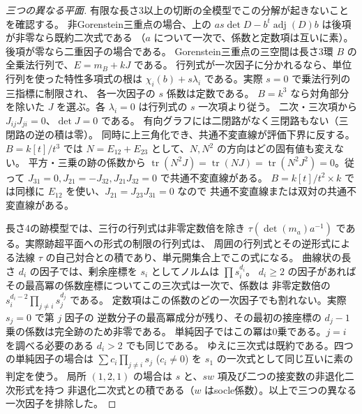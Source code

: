 \begin{proof}[三つの異なる平面]
有限な長さ3以上の切断の全模型でこの分解が起きないことを確認する。
非Gorenstein三重点の場合、上の $a s\det D-b^t\operatorname{adj}(D)b$ は後項が非零なら既約二次式である
（$a$ について一次で、係数と定数項は互いに素）。後項が零なら二重因子の場合である。
Gorenstein三重点の三空間は長さ3環 $B$ の全乗法行列で、$E=m_B+kJ$ である。
行列式が一次因子に分かれるなら、単位行列を使った特性多項式の根は
$\chi_i(b)+s\lambda_i$ である。実際 $s=0$ で乗法行列の三指標に制限され、
各一次因子の $s$ 係数は定数である。
$B=k^3$ なら対角部分を除いた $J$ を選ぶ。各 $\lambda_i=0$ は行列式の $s$ 一次項より従う。
二次・三次項から $J_{ij}J_{ji}=0$、$\det J=0$ である。
有向グラフには二閉路がなく三閉路もない（三閉路の逆の積は零）。
同時に上三角化でき、共通不変直線が評価下界に反する。
$B=k[t]/t^3$ では $N=E_{12}+E_{23}$ として、$N,N^2$ の方向はどの固有値も変えない。
平方・三乗の跡の係数から $\operatorname{tr}(N^2J)=\operatorname{tr}(NJ)=
\operatorname{tr}(N^2J^2)=0$。従って $J_{31}=0,J_{21}=-J_{32},J_{21}J_{32}=0$ で共通不変直線がある。
$B=k[t]/t^2\times k$ では同様に $E_{12}$ を使い、$J_{21}=J_{23}J_{31}=0$ なので
共通不変直線または双対の共通不変直線がある。

長さ4の跡模型では、三行の行列式は非零定数倍を除き
$\tau(\det(m_a)a^{-1})$ である。実際跡超平面への形式の制限の行列式は、
周囲の行列式とその逆形式による法線 $\tau$ の自己対合との積であり、単元開集合上でこの式になる。
曲線状の長さ $d_i$ の因子では、剰余座標を $s_i$ としてノルムは $\prod s_i^{d_i}$。
$d_i\ge2$ の因子があればその最高冪の係数座標についてこの三次式は一次で、係数は
非零定数倍の $s_i^{d_i-2}\prod_{j\ne i}s_j^{d_j}$ である。
定数項はこの係数のどの一次因子でも割れない。実際 $s_j=0$ で第 $j$ 因子の
逆数分子の最高冪成分が残り、その最初の接座標の $d_j-1$ 乗の係数は完全跡のため非零である。
単純因子ではこの冪は0乗である。$j=i$ を調べる必要のある $d_i>2$ でも同じである。
ゆえに三次式は既約である。四つの単純因子の場合は
$\sum c_i\prod_{j\ne i}s_j$ ($c_i\ne0$) を $s_1$ の一次式として同じ互いに素の判定を使う。
局所 $(1,2,1)$ の場合は $s$ と、$sw$ 項及び二つの接変数の非退化二次形式を持つ
非退化二次式との積である（$w$ はsocle係数）。以上で三つの異なる一次因子を排除した。
\end{proof}

